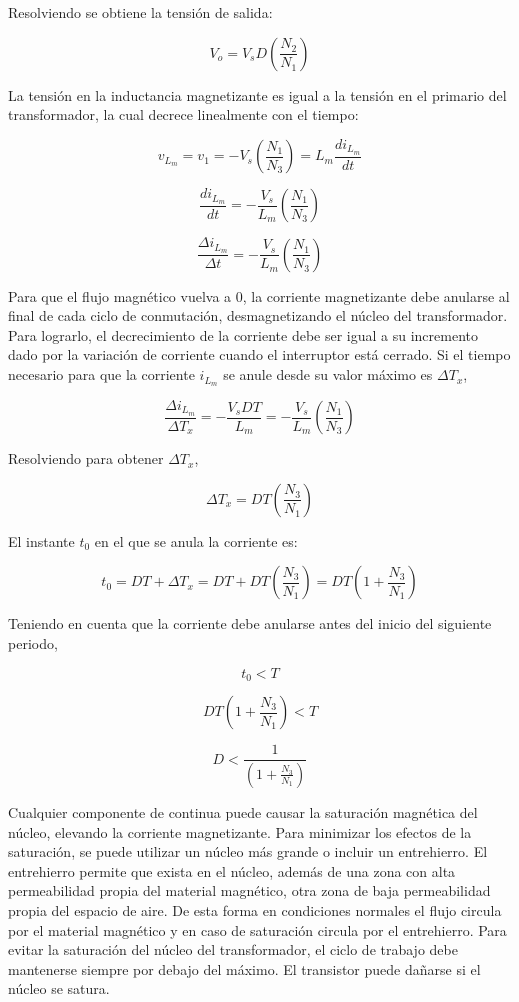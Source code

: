 Resolviendo se obtiene la tensión de salida:

$$ V_o=V_sD\left(\frac{N_2}{N_1}\right) $$

La tensión en la inductancia magnetizante es igual a la tensión en el primario del transformador, la cual decrece linealmente con el tiempo:

$$ v_{L_m}=v_1=-V_s\left(\frac{N_1}{N_3}\right)=L_m\frac{di_{L_m}}{dt} $$

$$ \frac{di_{L_m}}{dt}=-\frac{V_s}{L_m}\left(\frac{N_1}{N_3}\right) $$

$$ \frac{\Delta i_{L_m}}{\Delta t}=-\frac{V_s}{L_m}\left(\frac{N_1}{N_3}\right) $$ 

Para que el flujo magnético vuelva a 0, la corriente magnetizante debe anularse al final de cada ciclo de conmutación, desmagnetizando el núcleo del transformador.
Para lograrlo, el decrecimiento de la corriente debe ser igual a su incremento dado por la variación de corriente cuando el interruptor está cerrado. 
Si el tiempo necesario para que la corriente $i_{L_m}$ se anule desde su valor máximo es $\Delta T_x$, 

$$ \frac{\Delta i_{L_m}}{\Delta T_x}=-\frac{V_sDT}{L_m}=-\frac{V_s}{L_m}\left(\frac{N_1}{N_3}\right) $$

Resolviendo para obtener $\Delta T_x$,

$$ \Delta T_x=DT\left(\frac{N_3}{N_1}\right) $$

El instante $t_0$ en el que se anula la corriente es:

$$ t_0=DT+\Delta T_x=DT+DT\left(\frac{N_3}{N_1}\right)=DT\left(1+\frac{N_3}{N_1}\right) $$

Teniendo en cuenta que la corriente debe anularse antes del inicio del siguiente periodo,

$$ t_0<T $$

$$ DT\left(1+\frac{N_3}{N_1}\right)<T $$

$$ D<\frac{1}{\left(1+\frac{N_3}{N_1}\right)} $$

Cualquier componente de continua puede causar la saturación magnética del núcleo, 
elevando la corriente magnetizante. 
Para minimizar los efectos de la saturación, se puede utilizar un núcleo más grande o incluir un entrehierro.
El entrehierro permite que exista en el núcleo, además de una zona con alta permeabilidad propia del material magnético, 
otra zona de baja permeabilidad propia del espacio de aire. 
De esta forma en condiciones normales el flujo circula por el material magnético y en caso de saturación circula por el entrehierro. 
Para evitar la saturación del núcleo del transformador, el ciclo de trabajo debe mantenerse siempre por debajo del máximo.
El transistor puede dañarse si el núcleo se satura.

